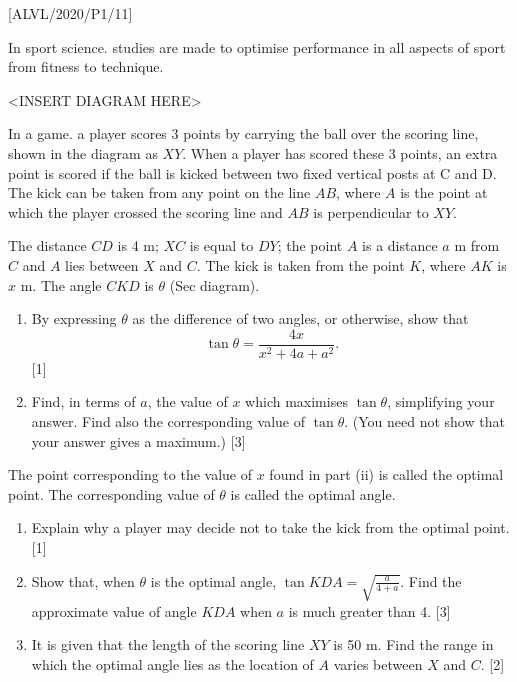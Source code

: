 \item {[}ALVL/2020/P1/11{]}

In sport science. studies are made to optimise performance in all
aspects of sport from fitness to technique.
\noindent \begin{center}
\textless INSERT DIAGRAM HERE\textgreater{}
\par\end{center}

In a game. a player scores 3 points by carrying the ball over the
scoring line, shown in the diagram as $XY$. When a player has scored
these 3 points, an extra point is scored if the ball is kicked between
two fixed vertical posts at C and D. The kick can be taken from any
point on the line $AB$, where $A$ is the point at which the player
crossed the scoring line and $AB$ is perpendicular to $XY$.

The distance $CD$ is 4 m; $XC$ is equal to $DY$; the point $A$
is a distance $a$ m from $C$ and $A$ lies between $X$ and $C$.
The kick is taken from the point $K$, where $AK$ is $x$ m. The
angle $CKD$ is $\theta$ (Sec diagram).
\begin{enumerate}
\item By expressing $\theta$ as the difference of two angles, or otherwise,
show that 
\[
\tan\theta=\frac{4x}{x^{2}+4a+a^{2}}.
\]
\hfill{}{[}1{]} 
\item Find, in terms of $a$, the value of $x$ which maximises $\tan\theta$,
simplifying your answer. Find also the corresponding value of $\tan\theta$.
(You need not show that your answer gives a maximum.) \hfill{}{[}3{]}
\end{enumerate}
The point corresponding to the value of $x$ found in part (ii) is
called the optimal point. The corresponding value of $\theta$ is
called the optimal angle.
\begin{enumerate}
\item Explain why a player may decide not to take the kick from the optimal
point. \hfill{}{[}1{]}
\item Show that, when $\theta$ is the optimal angle, $\tan KDA=\sqrt{\frac{a}{4+a}}$.
Find the approximate value of angle $KDA$ when $a$ is much greater
than 4.\hfill{} {[}3{]}
\item It is given that the length of the scoring line $XY$ is 50 m. Find
the range in which the optimal angle lies as the location of $A$
varies between $X$ and $C$.\hfill{} {[}2{]}
\end{enumerate}
